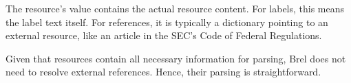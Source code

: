 The resource's value contains the actual resource content.
For labels, this means the label text itself.
For references, it is typically a dictionary pointing to an external resource, like an article in the SEC's Code of Federal Regulations.

Given that resources contain all necessary information for parsing, Brel does not need to resolve external references.
Hence, their parsing is straightforward.







